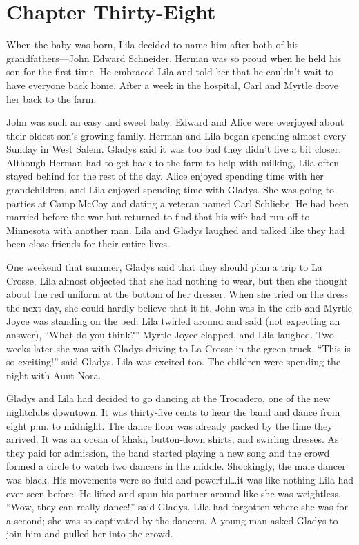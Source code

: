 \documentclass[
  american,
  letterpaper,
]{book}
\begin{document}

\chapter{Chapter Thirty-Eight}\label{chapter-thirty-eight}

When the baby was born, Lila decided to name him after both of his
grandfathers---John Edward Schneider. Herman was so proud when he held
his son for the first time. He embraced Lila and told her that he
couldn't wait to have everyone back home. After a week in the hospital,
Carl and Myrtle drove her back to the farm.

John was such an easy and sweet baby. Edward and Alice were overjoyed
about their oldest son's growing family. Herman and Lila began spending
almost every Sunday in West Salem. Gladys said it was too bad they
didn't live a bit closer. Although Herman had to get back to the farm to
help with milking, Lila often stayed behind for the rest of the day.
Alice enjoyed spending time with her grandchildren, and Lila enjoyed
spending time with Gladys. She was going to parties at Camp McCoy and
dating a veteran named Carl Schliebe. He had been married before the war
but returned to find that his wife had run off to Minnesota with another
man. Lila and Gladys laughed and talked like they had been close friends
for their entire lives.

One weekend that summer, Gladys said that they should plan a trip to La
Crosse. Lila almost objected that she had nothing to wear, but then she
thought about the red uniform at the bottom of her dresser. When she
tried on the dress the next day, she could hardly believe that it fit.
John was in the crib and Myrtle Joyce was standing on the bed. Lila
twirled around and said (not expecting an answer), ``What do you
think?'' Myrtle Joyce clapped, and Lila laughed. Two weeks later she was
with Gladys driving to La Crosse in the green truck. ``This is so
exciting!'' said Gladys. Lila was excited too. The children were
spending the night with Aunt Nora.

Gladys and Lila had decided to go dancing at the Trocadero, one of the
new nightclubs downtown. It was thirty-five cents to hear the band and
dance from eight p.m. to midnight. The dance floor was already packed by
the time they arrived. It was an ocean of khaki, button-down shirts, and
swirling dresses. As they paid for admission, the band started playing a
new song and the crowd formed a circle to watch two dancers in the
middle. Shockingly, the male dancer was black. His movements were so
fluid and powerful\ldots it was like nothing Lila had ever seen before.
He lifted and spun his partner around like she was weightless. ``Wow,
they can really dance!'' said Gladys. Lila had forgotten where she was
for a second; she was so captivated by the dancers. A young man asked
Gladys to join him and pulled her into the crowd.
\end{document}
